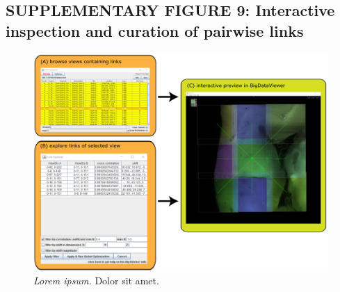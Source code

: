 \documentclass[]{spie}  %
\begin{document}
\subsection*{SUPPLEMENTARY FIGURE 9: Interactive inspection and curation of pairwise links}
\vspace{1mm}
\begin{figure}[h!]
\includegraphics[width=\textwidth]{Supp-Link-Explorer.png}
\vspace{-2.0mm}
\caption{\hspace{-0.5mm} \emph{Lorem ipsum.} Dolor sit amet.
}
\label{fig:sup-fig-link-explorer}
\end{figure}

\pagebreak
\end{document}
